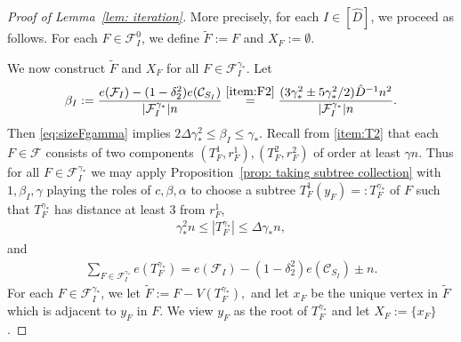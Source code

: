 \documentclass[a4paper, 11pt, reqno]{amsart}
\numberwithin{equation}{section}
\newcommand{\1}{{\rm 1\hspace*{-0.4ex}%
\rule{0.1ex}{1.52ex}\hspace*{0.2ex}}}
\newcommand{\cF}{\mathcal{F}}
\newcommand{\cC}{\mathcal{C}}
\newcommand{\I}{I}
\begin{document}
\begin{proof}[Proof of Lemma~\ref{lem: iteration}]
More precisely, for each $\I\in [\hat{D}]$, 
we proceed as follows. 
For each $F\in \cF^0_{\I}$, we define $\tilde{F} := F$ and $X_F:=\emptyset$. 

We now construct $\tilde{F}$ and $X_F$ for all $F\in \cF_\I^{\gamma_*}$.
Let 
\begin{align}
	\beta_{\I}:= \frac{e(\cF_{\I})- (1-\delta_2^2)e(\cC_{S_{\I}})}{|\cF_{\I}^{\gamma_*}| n}
	\stackrel{\ref{item:F2}}{=}\frac{(3\gamma_*^2 \pm 5\gamma_*^2/2)\hat{D}^{-1}n^2}{|\cF^{\gamma_*}_{\I}|n}.
\end{align}
Then \eqref{eq:sizeFgamma} implies 
$2\Delta \gamma_*^2 \leq \beta_{\I} 
\leq \gamma_*.$  
Recall from \ref{item:T2} that each $F\in \cF$ consists of two components $(T_F^1,r_F^1),(T_F^2,r_F^2)$ of order at least $\gamma n$.
Thus for all $F\in \cF_{\I}^{\gamma_*}$ we may apply Proposition~\ref{prop: taking subtree collection} with $1,\beta_\I, \gamma$ playing the roles of $c,\beta,\alpha$ to choose a subtree $T_F^1(y_F)=:T^{\gamma_*}_F$ of $F$ such that $T_F^{\gamma_*}$ has distance at least $3$ from $r^1_F$,
\begin{align}\label{eq:sizeTgamma}
	\gamma_*^2 n \leq |T^{\gamma_*}_F| \leq  \Delta\gamma_* n,
\end{align}
and 
\begin{align}\label{eq: gamma_* def}
\sum_{F\in \cF_{{\I}}^{\gamma_*}} e(T^{\gamma_*}_F) = e(\cF_{{\I}})- (1-\delta_2^2)e(\cC_{S_\I}) \pm n. 
\end{align}
For each $F\in \cF^{\gamma_*}_\I$, we let $\tilde{F} := F - V(T^{\gamma_*}_F),$ 
and let $x_F$ be the unique vertex in $\tilde{F}$ which is adjacent to $y_F$ in $F$. 
We view $y_F$ as the root of $T^{\gamma_*}_F$ and
let $X_F:=\{x_F\}$.


\end{proof}
\end{document}
